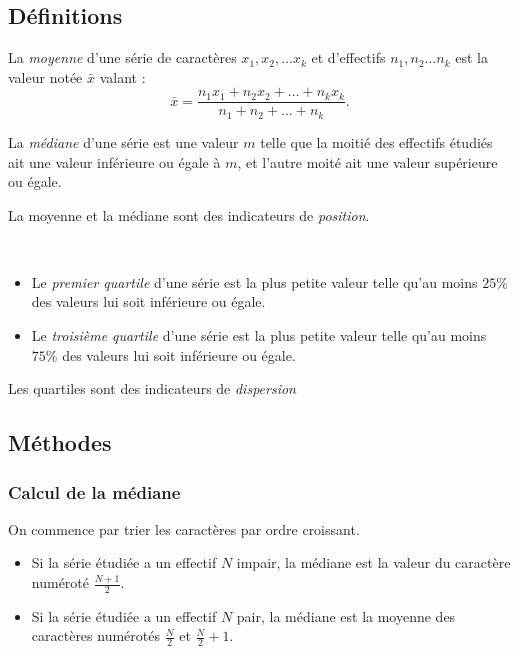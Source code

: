 \subsection{Définitions}

\begin{definition}[Moyenne]
  La \emph{moyenne} d'une série de caractères $x_1, x_2, \ldots x_k$ et d'effectifs $n_1, n_2 \ldots n_k$ est la valeur notée $\bar x$ valant :
  \[{\bar x}=\dfrac{n_1x_1+n_2x_2+\ldots+n_kx_k}{n_1+n_2+\ldots+n_k}.\]
\end{definition}

\begin{definition}[Médiane]
  La \emph{médiane} d'une série est une valeur $m$ telle que la moitié des effectifs étudiés ait une valeur inférieure ou égale à $m$, et l'autre moité ait une valeur supérieure ou égale.
\end{definition}

\begin{remarque}
  La moyenne et la médiane sont des indicateurs de \emph{position}.
\end{remarque}

\begin{definition}[Quartiles]~
  \begin{itemize}
    \item Le \emph{premier quartile} d'une série est la plus petite valeur telle qu'au moins $25\%$ des valeurs lui soit inférieure ou égale.
    \item Le \emph{troisième quartile} d'une série est la plus petite valeur telle qu'au moins $75\%$ des valeurs lui soit inférieure ou égale.
  \end{itemize}
\end{definition}

\begin{remarque}
  Les quartiles sont des indicateurs de \emph{dispersion}
\end{remarque}

\subsection{Méthodes}
\subsubsection{Calcul de la médiane}
On commence par trier les caractères par ordre croissant.
\begin{itemize}
  \item Si la série étudiée a un effectif $N$ impair, la médiane est la valeur du caractère numéroté $\frac{N+1}{2}$.
  \item Si la série étudiée a un effectif $N$ pair, la médiane est la moyenne des caractères numérotés $\frac{N}{2}$ et $\frac{N}{2}+1$.
\end{itemize}

